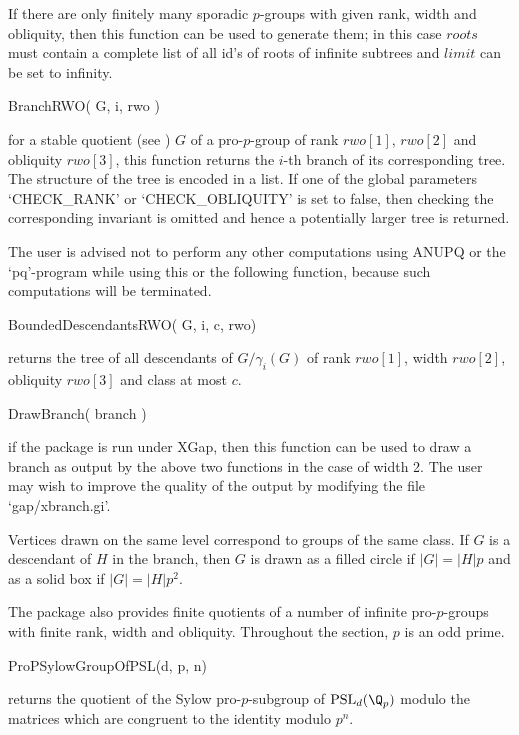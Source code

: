 If there are only finitely many sporadic $p$-groups with given rank,
width and obliquity, then this function can be used to generate them;
in this case $roots$ must contain a complete list of all id's of roots
of infinite subtrees and $limit$ can be set to infinity.

\> BranchRWO( G, i, rwo )

for a stable  quotient (see \cite{ER09}) $G$ of a pro-$p$-group of
rank $rwo[1]$, $rwo[2]$ and obliquity $rwo[3]$, this function returns
the $i$-th branch of its corresponding tree. The structure of the tree
is encoded in a list. If one of the global parameters `CHECK_RANK' or 
`CHECK_OBLIQUITY' is set to false, then checking the corresponding
invariant is omitted and hence a potentially larger tree is returned. 

The user is advised not to perform any other computations using ANUPQ
or the `pq'-program while using this or the following function,
because such computations will be terminated.

\> BoundedDescendantsRWO( G, i, c, rwo)

returns the tree of all descendants of $G/\gamma_i(G)$ of rank $rwo[1]$,
width $rwo[2]$, obliquity $rwo[3]$ and class at most $c$.

\> DrawBranch( branch )

if the package is run under XGap, then this function can be used to draw
a branch as output by the above two functions in the case of width 2.
The user may wish to improve the quality of the output by modifying
the file `gap/xbranch.gi'.

Vertices drawn on the same level correspond to groups of the same
class. If $G$ is a descendant of $H$ in the branch, then $G$ is drawn
as a filled circle if $\vert G\vert = \vert H\vert p$ and as a solid
box if $\vert G\vert = \vert H\vert p^2$.



The package also provides finite quotients of a number of infinite
pro-$p$-groups with finite rank, width and obliquity. Throughout the
section, $p$ is an odd prime.

\> ProPSylowGroupOfPSL(d, p, n)

returns the quotient of the Sylow pro-$p$-subgroup of
${\rm PSL}_d({\Q}_p)$ modulo the matrices which are congruent to the
identity modulo $p^n$. 
  
